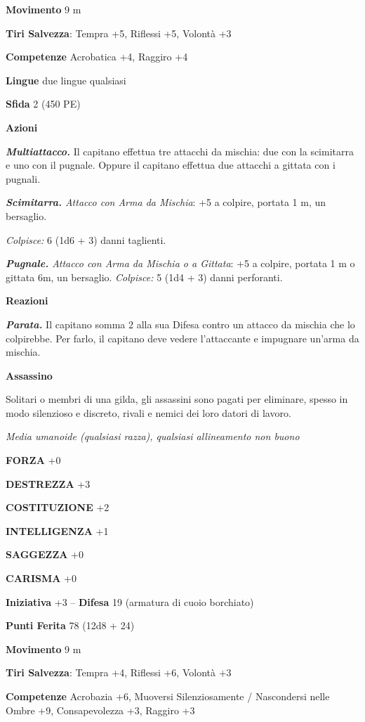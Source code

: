 \begin{multicols}{2}
\textbf{Movimento} 9 m

\textbf{Tiri Salvezza}: Tempra +5, Riflessi +5, Volontà +3 

\textbf{Competenze} Acrobatica +4, Raggiro +4 

\textbf{Lingue} due lingue qualsiasi

\textbf{Sfida} 2 (450 PE)

\textbf{Azioni}

\emph{\textbf{Multiattacco.}} Il capitano effettua tre attacchi da mischia: due con la scimitarra e uno con il pugnale. Oppure il capitano effettua due attacchi a gittata con i pugnali.

\emph{\textbf{Scimitarra.} Attacco con Arma da Mischia}: +5 a colpire, portata 1 m, un bersaglio.

\emph{Colpisce:} 6 (1d6 + 3) danni taglienti.

\emph{\textbf{Pugnale.} Attacco con Arma da Mischia o a Gittata}: +5 a colpire, portata 1 m o gittata 6m, un bersaglio. \emph{Colpisce:} 5 (1d4 + 3) danni perforanti.

\textbf{Reazioni}

\emph{\textbf{Parata.}} Il capitano somma 2 alla sua Difesa contro un attacco da mischia che lo colpirebbe. Per farlo, il capitano deve vedere l'attaccante e impugnare un'arma da mischia.

\medskip\textbf{Assassino}

Solitari o membri di una gilda, gli assassini sono pagati per eliminare, spesso in modo silenzioso e discreto, rivali e nemici dei loro datori di lavoro.

\emph{Media umanoide (qualsiasi razza), qualsiasi allineamento non buono}

\textbf{FORZA} +0

\textbf{DESTREZZA} +3

\textbf{COSTITUZIONE} +2

\textbf{INTELLIGENZA} +1

\textbf{SAGGEZZA} +0

\textbf{CARISMA} +0

\textbf{Iniziativa} +3 -- \textbf{Difesa} 19 (armatura di cuoio borchiato)

\textbf{Punti Ferita} 78 (12d8 + 24)

\textbf{Movimento} 9 m

\textbf{Tiri Salvezza}: Tempra +4, Riflessi +6, Volontà +3 

\textbf{Competenze} Acrobazia +6, Muoversi Silenziosamente / Nascondersi nelle Ombre +9, Consapevolezza +3, Raggiro +3



\end{multicols}

